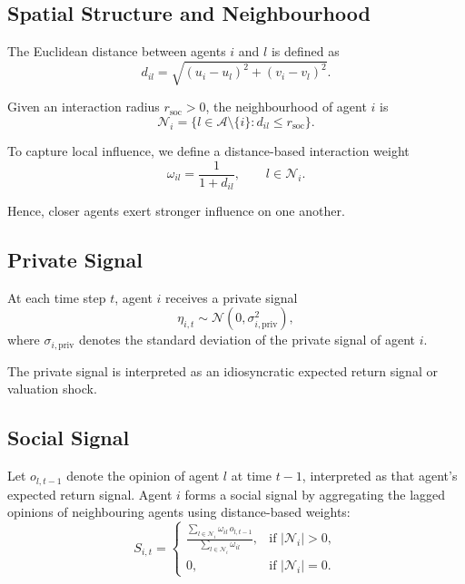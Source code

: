 \documentclass[12pt, a4paper]{article}
\begin{document}
    \subsection{Spatial Structure and Neighbourhood}

    The Euclidean distance between agents \(i\) and \(l\) is defined as
    \begin{equation}
        d_{il} = \sqrt{{\left(u_i-u_l\right)}^2 + {\left(v_i-v_l\right)}^2}.
    \end{equation}

    Given an interaction radius \(r_{\mathrm{soc}}>0\), the neighbourhood of agent
    \(i\) is
    \begin{equation}
        \mathcal{N}_i = \{l \in \mathcal{A}\setminus\{i\} : d_{il} \le r_{\mathrm{soc}}\}.
    \end{equation}

    To capture local influence, we define a distance-based interaction weight
    \begin{equation}
        \omega_{il} = \frac{1}{1+d_{il}}, \qquad l \in \mathcal{N}_i.
    \end{equation}

    Hence, closer agents exert stronger influence on one another.

    \subsection{Private Signal}

    At each time step \(t\), agent \(i\) receives a private signal
    \begin{equation}
        \eta_{i,t} \sim \mathcal{N}(0,\sigma_{i,\text{priv}}^2),
    \end{equation}
    where \(\sigma_{i,\text{priv}}\) denotes the standard deviation of the private
    signal of agent \(i\).

    The private signal is interpreted as an idiosyncratic expected return signal or valuation shock.

    \subsection{Social Signal}

    Let \(o_{l,t-1}\) denote the opinion of agent \(l\) at time \(t-1\),
    interpreted as that agent's expected return signal. Agent \(i\) forms a social
    signal by aggregating the lagged opinions of neighbouring agents using
    distance-based weights:
    \begin{equation}
        S_{i,t}=
        \begin{cases}
            \displaystyle
            \frac{\sum_{l \in \mathcal{N}_i} \omega_{il} \, o_{l,t-1}}{\sum_{l \in \mathcal{N}_i} \omega_{il}}, & \text{if } |\mathcal{N}_i|>0,\\
            0, & \text{if } |\mathcal{N}_i|=0.
        \end{cases}
    \end{equation}
\end{document}
